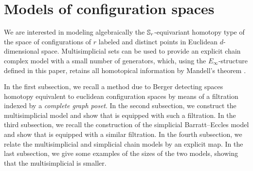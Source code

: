 
\section{Models of configuration spaces}

We are interested in modeling algebraically the $\mathbb{S}_r$-equivariant homotopy type of the space of configurations of $r$ labeled and distinct points in Euclidean $d$-dimensional space.
Multisimplicial sets can be used to provide an explicit chain complex model with a small number of generators, which, using the $E_\infty$-structure defined in this paper, retains all homotopical information by Mandell's theorem \cite{mandell2006homotopy_type}.

In the first subsection, we recall a method due to Berger detecting spaces homotopy equivalent to euclidean configuration spaces by means of a filtration indexed by a {\em complete graph poset}.
In the second subsection, we construct the multisimplicial model and show that is equipped with such a filtration.
In the third subsection, we recall the construction of the simplicial Barratt--Eccles model and show that is equipped with a similar filtration.
In the fourth subsection, we relate the multisimplicial and simplicial chain models by an explicit map.
In the last subsection, we give some examples of the sizes of the two models, showing that the multisimplicial is smaller.





